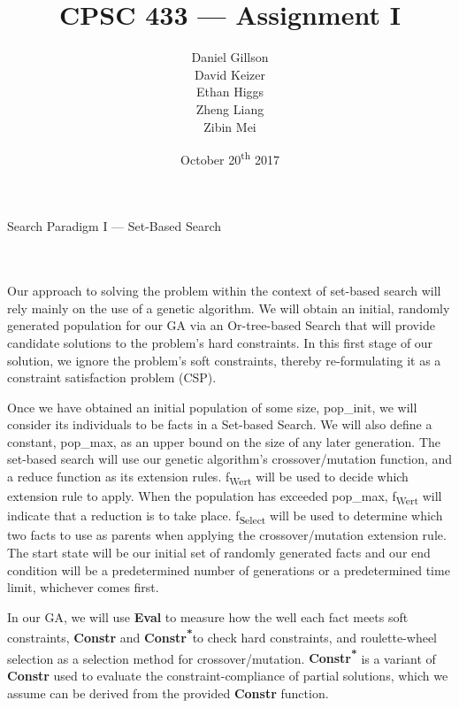 \documentclass[11pt, oneside]{article}   	%
\title{\vspace{40mm}CPSC 433 --- Assignment I}
\author{
	Daniel Gillson\\
	David Keizer\\
	Ethan Higgs\\
	Zheng Liang\\
	Zibin Mei}
\date{October 20\textsuperscript{th} 2017}
\newenvironment{cmr}{\fontfamily{cmr}\selectfont}{\par}
\begin{document}
\maketitle
\break

\centerline{{\Large Search Paradigm I --- Set-Based Search}}

\\\\
\begin{cmr}
\indent Our approach to solving the problem within the context of set-based search will rely mainly on the use of a genetic algorithm.
We will obtain an initial, randomly generated population for our GA via an Or-tree-based Search that will provide candidate solutions to the problem's
hard constraints. In this first stage of our solution, we ignore the problem's soft constraints, thereby re-formulating it as a constraint satisfaction problem (CSP).

\indent Once we have obtained an initial population of some size, pop_init, we will consider its individuals to be facts in a Set-based Search.
We will also define a constant, pop_max, as an upper bound on the size of any later generation.
The set-based search will use our genetic algorithm's crossover/mutation function, and a reduce function as its extension rules.
f\textsubscript{Wert} will be used to decide which extension rule to apply.
When the population has exceeded pop_max, f\textsubscript{Wert} will indicate that a reduction is to take place.
f\textsubscript{Select} will be used to determine which two facts to use as parents when applying the crossover/mutation extension rule.
The start state will be our initial set of randomly generated facts and our end condition will be a predetermined number of generations or a predetermined time limit, whichever comes first.

\indent In our GA, we will use \textbf{Eval} to measure how the well each fact meets soft constraints, \textbf{Constr} and \textbf{Constr\textsuperscript{*}}to check hard constraints, and roulette-wheel selection as a selection method for crossover/mutation.
\textbf{Constr\textsuperscript{*}} is a variant of \textbf{Constr} used to evaluate the constraint-compliance of partial solutions, which we assume can be derived from the provided \textbf{Constr} function.
\end{cmr}

\end{document}
